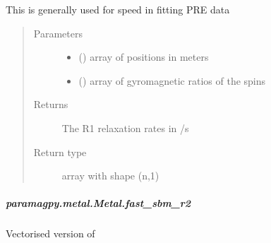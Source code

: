 \documentclass[a4paper,10pt,english,openany,oneside]{sphinxmanual}
\begin{document}
\begin{fulllineitems}
\begin{fulllineitems}
\begin{fulllineitems}
This is generally used for speed in fitting PRE data
\begin{quote}\begin{description}
\item[{Parameters}] \leavevmode\begin{itemize}
\item {} 
 (\sphinxstyleliteralemphasis{\sphinxupquote{ (}}\sphinxstyleliteralemphasis{\sphinxupquote{,}}\sphinxstyleliteralemphasis{\sphinxupquote{)}}) \textendash{} array of positions in meters

\item {} 
 (\sphinxstyleliteralemphasis{\sphinxupquote{ (}}\sphinxstyleliteralemphasis{\sphinxupquote{,}}\sphinxstyleliteralemphasis{\sphinxupquote{)}}) \textendash{} array of gyromagnetic ratios of the spins

\end{itemize}

\item[{Returns}] \leavevmode
{} \textendash{} The R1 relaxation rates in /s

\item[{Return type}] \leavevmode
array with shape (n,1)

\end{description}\end{quote}

\end{fulllineitems}



\subparagraph{paramagpy.metal.Metal.fast\_sbm\_r2}
\label{\detokenize{reference/generated/paramagpy.metal.Metal.fast_sbm_r2:paramagpy-metal-metal-fast-sbm-r2}}\label{\detokenize{reference/generated/paramagpy.metal.Metal.fast_sbm_r2::doc}}

\begin{fulllineitems}
\label{\detokenize{reference/generated/paramagpy.metal.Metal.fast_sbm_r2:paramagpy.metal.Metal.fast_sbm_r2}}
Vectorised version of {\hyperref[\detokenize{reference/generated/paramagpy.metal.Metal.sbm_r2:paramagpy.metal.Metal.sbm_r2}]{}}


\end{fulllineitems}
\end{fulllineitems}
\end{fulllineitems}
\end{document}
